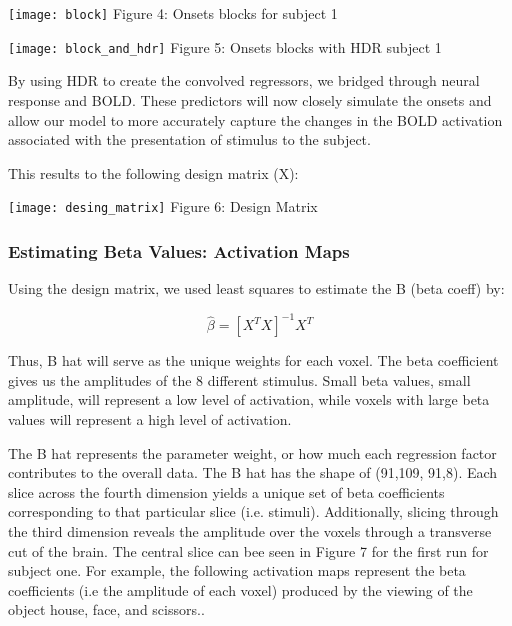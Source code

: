 \documentclass[12pt]{article}
\begin{document}
    \centering
      \texttt{[image: block]}
Figure 4: Onsets blocks for subject 1




    \centering
      \texttt{[image: block\_and\_hdr]}
Figure 5: Onsets blocks with HDR subject 1




    

By using HDR to create the convolved regressors, we bridged through neural 
response and BOLD. These predictors will now closely simulate the onsets and 
allow our model to more accurately capture the changes in the BOLD activation 
associated with the presentation of stimulus to the subject.

This results to the following design matrix (X):


    \centering
      \texttt{[image: desing\_matrix]}
Figure 6: Design Matrix




\subsubsection{Estimating Beta Values: Activation Maps}
Using the design matrix, we used least squares to estimate the B (beta coeff) by:

\begin{equation}
    \hat{\beta }= [X^{T}X]^{-1} X^{T}
\end{equation}


Thus, B hat will serve as the unique weights for each voxel. The beta 
coefficient gives us the amplitudes of the 8 different stimulus. Small beta values, small amplitude,
will represent a low level of activation, while voxels with large beta values will
represent a high level of activation.

The B hat represents the parameter weight, or how much each regression factor 
contributes to the overall data. The B hat has the shape of (91,109, 91,8). 
Each slice across the fourth dimension yields a unique set of beta coefficients 
corresponding to that particular slice (i.e. stimuli). Additionally, slicing 
through the third dimension reveals the amplitude over the voxels through a 
transverse cut of the brain. The central slice can bee seen in Figure 7 for the 
first run for subject one.
For example, the following activation maps represent the beta 
coefficients (i.e the amplitude of each voxel) produced by the viewing of the 
object house, face, and scissors..
\end{document}

